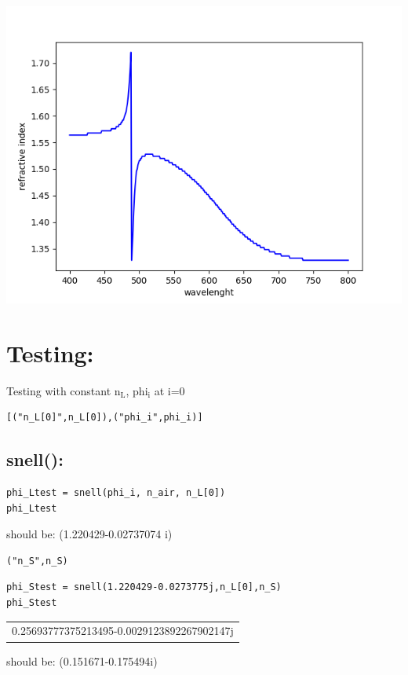 \documentclass[11pt]{article}
\begin{document}
\begin{center}
\includegraphics[width=.9\linewidth]{index.png}
\end{center}
\section{Testing:}
\label{sec:org0cbf928}

Testing with constant n\(_{\text{L}}\), phi\(_{\text{i}}\) at i=0
\begin{verbatim}
[("n_L[0]",n_L[0]),("phi_i",phi_i)]
\end{verbatim}

\subsection{snell():}
\label{sec:org22b0900}

\begin{verbatim}
phi_Ltest = snell(phi_i, n_air, n_L[0])
phi_Ltest
\end{verbatim}
should be: (1.220429-0.02737074 i)

\begin{verbatim}
("n_S",n_S)
\end{verbatim}

\begin{verbatim}
phi_Stest = snell(1.220429-0.0273775j,n_L[0],n_S)
phi_Stest
\end{verbatim}

\begin{center}
\begin{tabular}{l}
0.25693777375213495-0.0029123892267902147j\\
\end{tabular}
\end{center}
should be: (0.151671-0.175494i)
\end{document}
